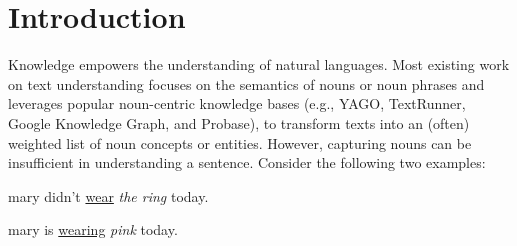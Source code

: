 \section{Introduction}

Knowledge empowers the understanding of natural languages.
Most existing work on text
understanding\cite{GabrilovichM07:ESA,Song11:Conceptualize}
focuses on the semantics of nouns or noun phrases and leverages
popular noun-centric knowledge bases (e.g., YAGO\cite{SuchanekKW07},
TextRunner\cite{BankoCSBE07}, Google Knowledge Graph\cite{singhal2012:gkg},
and Probase\cite{WuLWZ12}), to transform texts into an (often) weighted
list of noun concepts or entities.
However, capturing nouns can be insufficient in understanding
a sentence. Consider the following two examples:
\begin{example}\label{eg:wear1}
mary didn't \underline{wear} {\em the ring} today.
\end{example}
\begin{example}\label{eg:wear2}
mary is \underline{wearing} {\em pink} today.
\end{example}
